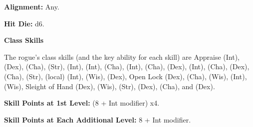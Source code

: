 
\textbf{Alignment:} Any.

\textbf{Hit Die:} d6.

\textbf{Class Skills}

The rogue's class skills (and the key ability for each skill) are Appraise (Int), 
 (Dex),  (Cha),  (Str),  (Int),  (Int),  
(Cha),  (Int),  (Cha),  (Dex),  (Int), 
 (Cha),  (Dex),  (Cha),  (Str),  (local) 
(Int),  (Wis),  (Dex), Open Lock (Dex),  (Cha),  
(Wis),  (Int),  (Wis), Sleight of Hand (Dex),  (Wis),  
(Str),  (Dex),  (Cha), and  (Dex).

\textbf{Skill Points at 1st Level:} (8 + Int modifier) x4.

\textbf{Skill Points at Each Additional Level:} 8 + Int modifier.

